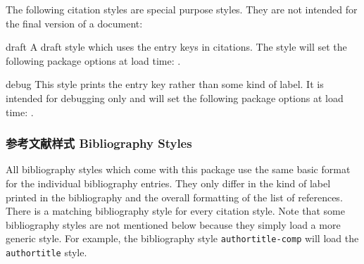 The following citation styles are special purpose styles. They are not intended for the final version of a document:

\begin{marglist}

\item[draft]
A draft style which uses the entry keys in citations. The style will set the following package options at load time: .

\item[debug]
This style prints the entry key rather than some kind of label. It is intended for debugging only and will set the following package options at load time: .

\end{marglist}

\subsubsection{参考文献样式 Bibliography Styles}
\label{use:xbx:bbx}

All bibliography styles which come with this package use the same basic format for the individual bibliography entries. They only differ in the kind of label printed in the bibliography and the overall formatting of the list of references. There is a matching bibliography style for every citation style. Note that some bibliography styles are not mentioned below because they simply load a more generic style. For example, the bibliography style \texttt{authortitle-comp} will load the \texttt{authortitle} style.

